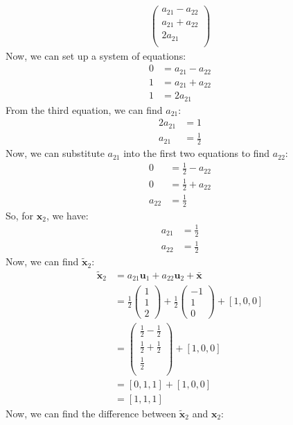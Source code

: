 \documentclass[a3paper,12pt]{extarticle} %
\begin{document}
\begin{enumerate}
\begin{align}
\begin{pmatrix}
a_{21} - a_{22}\\
a_{21} + a_{22}\\
2a_{21}\\
\end{pmatrix}
\end{align}
Now, we can set up a system of equations:
\begin{align}
0 &= a_{21} - a_{22}\\
1 &= a_{21} + a_{22}\\
1 &= 2a_{21}
\end{align}
From the third equation, we can find $a_{21}$:
\begin{align}
2a_{21} &= 1\\
a_{21} &= \frac{1}{2}
\end{align}
Now, we can substitute $a_{21}$ into the first two equations to find $a_{22}$:
\begin{align}
0 &= \frac{1}{2} - a_{22}\\
0 &= \frac{1}{2} + a_{22}\\
a_{22} &= \frac{1}{2}
\end{align}
So, for $\mathbf{x}_2$, we have:
\begin{align}
a_{21} &= \frac{1}{2}\\
a_{22} &= \frac{1}{2}
\end{align}
Now, we can find $\tilde{\mathbf{x}}_2$:
\begin{align}
\tilde{\mathbf{x}}_2 &= a_{21}\mathbf{u}_1 + a_{22}\mathbf{u}_2 + \bar{\mathbf{x}}\\
&= \frac{1}{2}\begin{pmatrix}
1\\
1\\
2
\end{pmatrix} + \frac{1}{2}\begin{pmatrix}
-1\\
1\\
0
\end{pmatrix} + [1, 0, 0]\\
&= \begin{pmatrix}
\frac{1}{2} - \frac{1}{2}\\
\frac{1}{2} + \frac{1}{2}\\
\frac{1}{2}\\
\end{pmatrix} + [1, 0, 0]\\
&= [0, 1, 1] + [1, 0, 0]\\
&= [1, 1, 1]
\end{align}
Now, we can find the difference between $\tilde{\mathbf{x}}_2$ and $\mathbf{x}_2$:

\end{enumerate}
\end{document}
